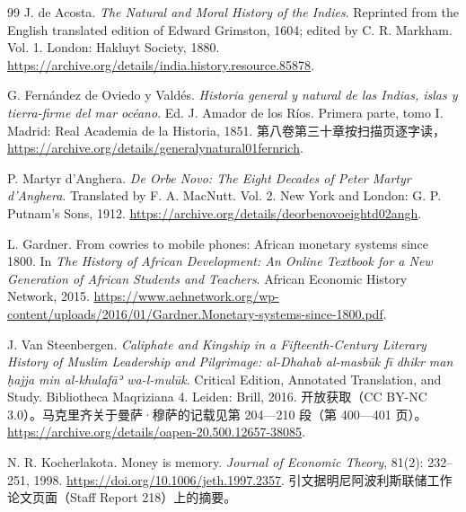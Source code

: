 \begin{thebibliography}{99}
 J. de Acosta. \emph{The Natural and Moral History of the Indies}. Reprinted from the English translated edition of Edward Grimston, 1604; edited by C. R. Markham. Vol. 1. London: Hakluyt Society, 1880. \url{https://archive.org/details/india.history.resource.85878}.

 G. Fernández de Oviedo y Valdés. \emph{Historia general y natural de las Indias, islas y tierra-firme del mar océano}. Ed. J. Amador de los Ríos. Primera parte, tomo I. Madrid: Real Academia de la Historia, 1851. 第八卷第三十章按扫描页逐字读，\url{https://archive.org/details/generalynatural01fernrich}.

 P. Martyr d'Anghera. \emph{De Orbe Novo: The Eight Decades of Peter Martyr d'Anghera}. Translated by F. A. MacNutt. Vol. 2. New York and London: G. P. Putnam's Sons, 1912. \url{https://archive.org/details/deorbenovoeightd02angh}.

 L. Gardner. From cowries to mobile phones: African monetary systems since 1800. In \emph{The History of African Development: An Online Textbook for a New Generation of African Students and Teachers}. African Economic History Network, 2015. \url{https://www.aehnetwork.org/wp-content/uploads/2016/01/Gardner.Monetary-systems-since-1800.pdf}.

 J. Van Steenbergen. \emph{Caliphate and Kingship in a Fifteenth-Century Literary History of Muslim Leadership and Pilgrimage: al-Dhahab al-masbūk fī dhikr man ḥajja min al-khulafāʾ wa-l-mulūk}. Critical Edition, Annotated Translation, and Study. Bibliotheca Maqriziana 4. Leiden: Brill, 2016. 开放获取（CC BY-NC 3.0）。马克里齐关于曼萨·穆萨的记载见第 204—210 段（第 400—401 页）。\url{https://archive.org/details/oapen-20.500.12657-38085}.

 N. R. Kocherlakota. Money is memory. \emph{Journal of Economic Theory}, 81(2): 232--251, 1998. \url{https://doi.org/10.1006/jeth.1997.2357}. 引文据明尼阿波利斯联储工作论文页面（Staff Report 218）上的摘要。


\end{thebibliography}
